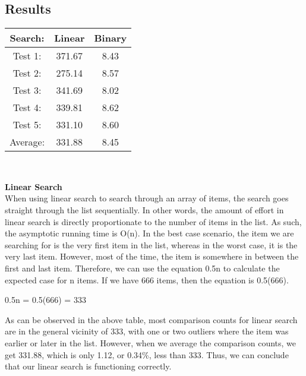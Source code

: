 \documentclass{article}
\begin{document}
\subsection{Results}
\begin{center}
\begin{tabular}{||c | c c ||} 
 \hline
 Search: & Linear & Binary\\ [0.5ex] 
 \hline\hline
 Test 1: & 371.67 & 8.43\\ 
 \hline
 Test 2: & 275.14 & 8.57\\
 \hline
 Test 3: & 341.69 & 8.02\\
 \hline
 Test 4: & 339.81 & 8.62\\
 \hline
 Test 5: & 331.10 & 8.60\\
 \hline
 Average: & 331.88 & 8.45\\ [1ex] 
 \hline
\end{tabular}
\\
\end{center}

\textbf{Linear Search} \\
When using linear search to search through an array of items, the search goes straight through the list sequentially. In other words, the amount of effort in linear search is directly proportionate to the number of items in the list. As such, the asymptotic running time is O(n). In the best case scenario, the item we are searching for is the very first item in the list, whereas in the worst case, it is the very last item. However, most of the time, the item is somewhere in between the first and last item. Therefore, we can use the equation 0.5n to calculate the expected case for n items. If we have 666 items, then the equation is 0.5(666).
\begin{center}
    0.5n = 0.5(666) = 333
\end{center}
As can be observed in the above table, most comparison counts for linear search are in the general vicinity of 333, with one or two outliers where the item was earlier or later in the list. However, when we average the comparison counts, we get 331.88, which is only 1.12, or 0.34\%, less than 333. Thus, we can conclude that our linear search is functioning correctly. \\
\end{document}
